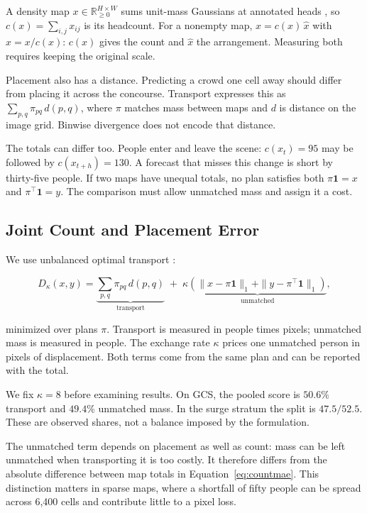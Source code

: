 \documentclass{article}
\begin{document}
A density map $x \in \mathbb{R}^{H \times W}_{\geq 0}$ sums unit-mass Gaussians at annotated heads \cite{lempitsky2010}, so $c(x) = \sum_{i,j} x_{ij}$ is its headcount. For a nonempty map, $x = c(x)\,\hat{x}$ with $\hat{x} = x / c(x)$: $c(x)$ gives the count and $\hat{x}$ the arrangement. Measuring both requires keeping the original scale.

Placement also has a distance. Predicting a crowd one cell away should differ from placing it across the concourse. Transport expresses this as $\sum_{p,q} \pi_{pq}\, d(p,q)$, where $\pi$ matches mass between maps and $d$ is distance on the image grid. Binwise divergence does not encode that distance.

The totals can differ too. People enter and leave the scene: $c(x_t) = 95$ may be followed by $c(x_{t+h}) = 130$. A forecast that misses this change is short by thirty-five people. If two maps have unequal totals, no plan satisfies both $\pi \mathbf{1} = x$ and $\pi^\top \mathbf{1} = y$. The comparison must allow unmatched mass and assign it a cost.

\subsection{Joint Count and Placement Error}
\label{sec:motivation-uot}

We use unbalanced optimal transport \cite{chizat2018, peyre2019}:

\begin{equation}
\label{eq:dkappa}
D_\kappa(x, y) = \underbrace{\sum_{p,q} \pi_{pq}\, d(p,q)}_{\text{transport}} \;+\; \kappa \underbrace{\left( \|x - \pi \mathbf{1}\|_1 + \|y - \pi^\top \mathbf{1}\|_1 \right)}_{\text{unmatched}},
\end{equation}

minimized over plans $\pi$. Transport is measured in people times pixels; unmatched mass is measured in people. The exchange rate $\kappa$ prices one unmatched person in pixels of displacement. Both terms come from the same plan and can be reported with the total.

We fix $\kappa = 8$ before examining results. On GCS, the pooled score is $50.6\%$ transport and $49.4\%$ unmatched mass. In the surge stratum the split is $47.5/52.5$. These are observed shares, not a balance imposed by the formulation.

The unmatched term depends on placement as well as count: mass can be left unmatched when transporting it is too costly. It therefore differs from the absolute difference between map totals in Equation~\ref{eq:countmae}. This distinction matters in sparse maps, where a shortfall of fifty people can be spread across 6{,}400 cells and contribute little to a pixel loss.
\end{document}
